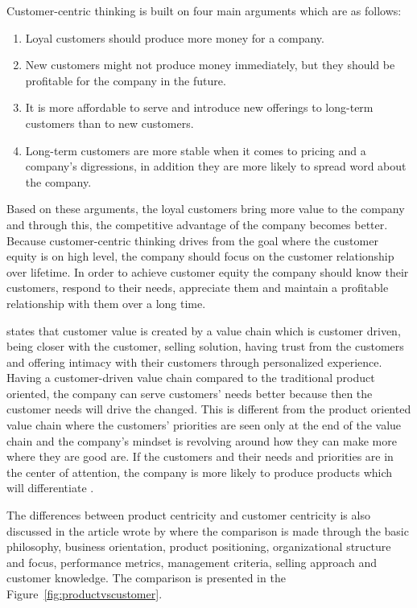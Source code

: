 Customer-centric thinking is built on four main arguments which are as follows:
\begin{enumerate}
\item Loyal customers should produce more money for a company.
\item New customers might not produce money immediately, but they should be profitable for the company in the future.
\item  It is more affordable to serve and introduce new offerings to long-term customers than to new customers.
\item  Long-term customers are more stable when it comes to pricing and a company's digressions, in addition they are more likely to spread word about the company. \parencite{Parniangtong:2017}
\end{enumerate}

Based on these arguments, the loyal customers bring more value to the company and through this, the competitive advantage of the company becomes better. Because customer-centric thinking drives from the goal where the customer equity is on high level, the company should focus on the customer relationship over lifetime. In order to achieve customer equity the company should know their customers, respond to their needs, appreciate them and maintain a profitable relationship with them over a long time. \parencite{Parniangtong:2017}

\textcite{Parniangtong:2017} states that customer value is created by a value chain which is customer driven, being closer with the customer, selling solution, having trust from the customers and offering intimacy with their customers through personalized experience. Having a customer-driven value chain compared to the traditional product oriented, the company can serve customers' needs better because then the customer needs will drive the changed. This is different from the product oriented value chain where the customers' priorities are seen only at the end of the value chain and the company's mindset is revolving around how they can make more where they are good are. If the customers and their needs and priorities are in the center of attention, the company is more likely to produce products which will differentiate \parencite{Parniangtong:2017}.

The differences between product centricity and customer centricity is also discussed in the article wrote by \textcite{PathToCustomerCentricity:2006} where the comparison is made through the basic philosophy, business orientation, product positioning, organizational structure and focus, performance metrics, management criteria, selling approach and customer knowledge. The comparison is presented in the Figure~\ref{fig:productvscustomer}.

